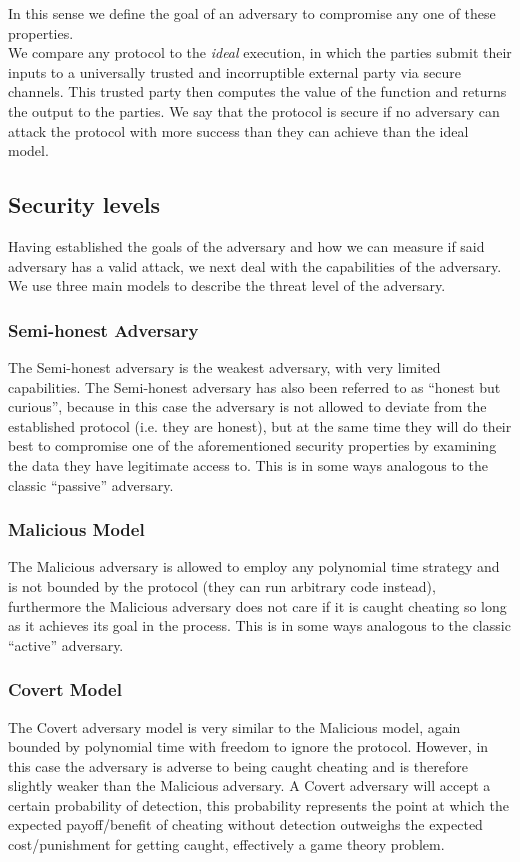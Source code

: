 \documentclass[a4paper,11pt]{article}
\begin{document}
			In this sense we define the goal of an adversary to compromise any one of these properties.\\

			We compare any protocol to the \emph{ideal} execution, in which the parties submit their inputs to a universally trusted and incorruptible external party via secure channels. This trusted party then computes the value of the function and returns the output to the parties. We say that the protocol is secure if no adversary can attack the protocol with more success than they can achieve than the ideal model.


		\subsection{Security levels}\label{sub:securityLevels}
			Having established the goals of the adversary and how we can measure if said adversary has a valid attack, we next deal with the capabilities of the adversary. We use three main models to describe the threat level of the adversary.

			\subsubsection{Semi-honest Adversary}
				The Semi-honest adversary is the weakest adversary, with very limited capabilities. The Semi-honest adversary has also been referred to as ``honest but curious'', because in this case the adversary is not allowed to deviate from the established protocol (i.e. they are honest), but at the same time they will do their best to compromise one of the aforementioned security properties by examining the data they have legitimate access to. This is in some ways analogous to the classic ``passive'' adversary.

			\subsubsection{Malicious Model}
				The Malicious adversary is allowed to employ any polynomial time strategy and is not bounded by the protocol (they can run arbitrary code instead), furthermore the Malicious adversary does not care if it is caught cheating so long as it achieves its goal in the process. This is in some ways analogous to the classic ``active'' adversary.

			\subsubsection{Covert Model}
				The Covert adversary model is very similar to the Malicious model, again bounded by polynomial time with freedom to ignore the protocol. However, in this case the adversary is adverse to being caught cheating and is therefore slightly weaker than the Malicious adversary. A Covert adversary will accept a certain probability of detection, this probability represents the point at which the expected payoff/benefit of cheating without detection outweighs the expected cost/punishment for getting caught, effectively a game theory problem.\\
\end{document}
